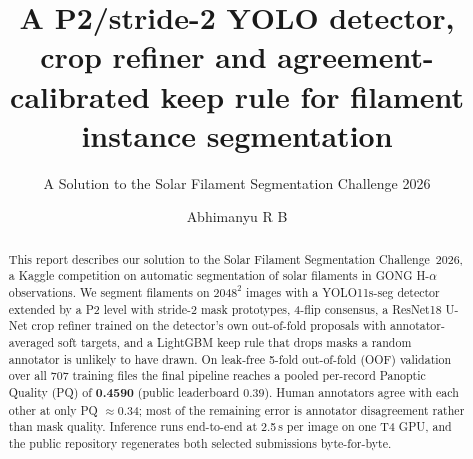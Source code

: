 \documentclass[sigconf]{acmart}
\begin{document}
\title{A P2/stride-2 YOLO detector, crop refiner and agreement-calibrated keep rule for filament instance segmentation}
\subtitle{A Solution to the Solar Filament Segmentation Challenge 2026} %

\author{Abhimanyu R B}

\begin{abstract}
This report describes our solution to the Solar Filament Segmentation Challenge~2026, a Kaggle competition on automatic segmentation of solar filaments in GONG H-$\alpha$ observations.
We segment filaments on $2048^2$ images with a YOLO11s-seg detector extended by a P2 level with stride-2 mask prototypes, 4-flip consensus, a ResNet18 U-Net crop refiner trained on the detector's own out-of-fold proposals with annotator-averaged soft targets, and a LightGBM keep rule that drops masks a random annotator is unlikely to have drawn. On leak-free 5-fold out-of-fold (OOF) validation over all 707 training files the final pipeline reaches a pooled per-record Panoptic Quality (PQ) of \textbf{0.4590} (public leaderboard 0.39). Human annotators agree with each other at only PQ $\approx$0.34; most of the remaining error is annotator disagreement rather than mask quality. Inference runs end-to-end at 2.5\,s per image on one T4 GPU, and the public repository regenerates both selected submissions byte-for-byte.
\end{abstract}

\maketitle

\ifguideStyle
{}
\par\medskip
\fi

\end{document}
